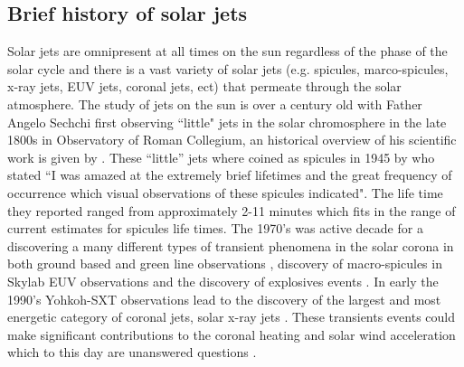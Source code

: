 \documentclass[12pt]{ociamthesis}
\begin{document}
\subsection{Brief history of solar jets}
\label{subsec:hist_of_jets}
Solar jets are omnipresent at all times on the sun regardless of the phase of the solar cycle \citep{Raouafi2016} and there is a vast variety of solar jets (e.g. spicules, marco-spicules, x-ray jets, EUV jets, coronal jets, ect) that permeate through the solar atmosphere. The study of jets on the sun is over a century old with Father Angelo Sechchi first observing ``little" jets in the solar chromosphere in the late 1800s in Observatory of Roman Collegium, an historical overview of his scientific work is given by \citep{Bruck1979IrAJ}. These ``little'' jets where coined as spicules in 1945 by \cite{Roberts1945ApJ} who stated ``I was amazed at the extremely brief lifetimes and the great frequency of occurrence which visual observations of these spicules indicated". The life time they reported ranged from approximately 2-11 minutes which fits in the range of current estimates for spicules life times. The 1970's was active decade for a discovering a many different types of transient phenomena in the solar corona in both ground based and green line observations \citep{Demastus1973}, discovery of macro-spicules in Skylab EUV observations \citep{Bohlin1975ApJ197L133B, Withbroe1976ApJ} and the discovery of explosives events \citep{Brueckner1980HiA}. In early the 1990's Yohkoh-SXT observations lead to the discovery of the largest and most energetic category of coronal jets, solar x-ray jets \citep{Shibata1992PASJ,Strong1992PASJ}. These transients events could make significant contributions to the coronal heating and solar wind acceleration which to this day are unanswered questions \citep{Martinez-Sykora2017, Pontieu2017ApJ, Samanta2019Sci, Zuo2019AcASn, Bale2019Natur}. %
\end{document}
